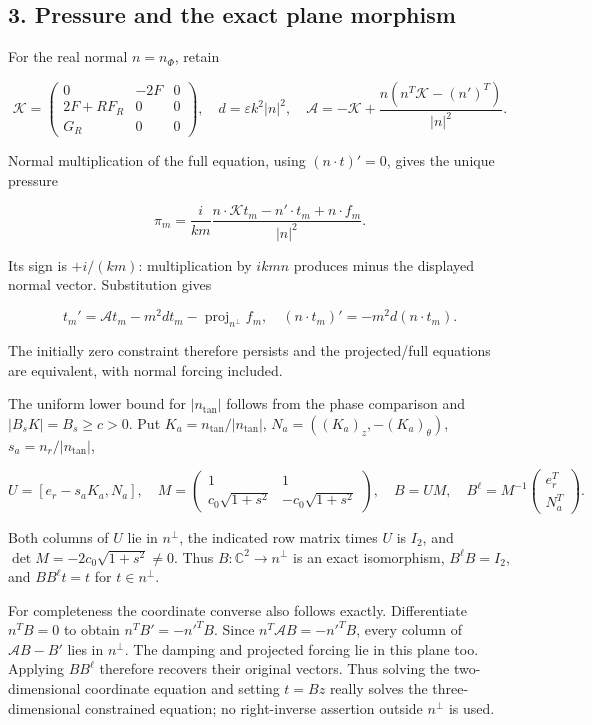 \documentclass[10pt,a4paper]{article}
\newcommand{\N}{\mathcal N_K}
\begin{document}
\subsection{3. Pressure and the exact plane morphism}\label{gclosure:pressure-and-the-exact-plane-morphism}

For the real normal \(n=n_\Phi\), retain

\[
\mathcal K=\begin{pmatrix}0&-2F&0\\2F+RF_R&0&0\\G_R&0&0\end{pmatrix},\quad
d=\varepsilon k^2|n|^2,\quad
\mathcal A=-\mathcal K+\frac{n(n^T\mathcal K-(n')^T)}{|n|^2}.
\]

Normal multiplication of the full equation, using \((n\cdot t)'=0\), gives the unique pressure

\[
\pi_m=\frac{i}{km}\frac{n\cdot\mathcal Kt_m-n'\cdot t_m+n\cdot f_m}{|n|^2}.
\]

Its sign is \(+i/(km)\): multiplication by \(ikm n\) produces minus the displayed normal vector. Substitution gives

\[
t_m'=\mathcal A t_m-m^2dt_m-\operatorname{proj}_{n^\perp}f_m,
\quad
(n\cdot t_m)'=-m^2d(n\cdot t_m).
\]

The initially zero constraint therefore persists and the projected/full equations are equivalent, with normal forcing included.

The uniform lower bound for \(|n_{\tan}|\) follows from the phase comparison and \(|B_sK|=B_s\ge c>0\). Put \(K_a=n_{\tan}/|n_{\tan}|\), \(N_a=((K_a)_z,-(K_a)_\theta)\), \(s_a=n_r/|n_{\tan}|\),

\[
U=[e_r-s_aK_a,N_a],\quad
M=\begin{pmatrix}1&1\\c_0\sqrt{1+s^2}&-c_0\sqrt{1+s^2}\end{pmatrix},\quad
B=UM,\quad B^\ell=M^{-1}\begin{pmatrix}e_r^T\\N_a^T\end{pmatrix}.
\]

Both columns of \(U\) lie in \(n^\perp\), the indicated row matrix times \(U\) is \(I_2\), and \(\det M=-2c_0\sqrt{1+s^2}\ne0\). Thus \(B:\mathbb C^2\to n^\perp\) is an exact isomorphism, \(B^\ell B=I_2\), and \(BB^\ell t=t\) for \(t\in n^\perp\).

For completeness the coordinate converse also follows exactly. Differentiate \(n^TB=0\) to obtain \(n^TB'=-n'^TB\). Since \(n^T\mathcal AB=-n'^TB\), every column of \(\mathcal AB-B'\) lies in \(n^\perp\). The damping and projected forcing lie in this plane too. Applying \(BB^\ell\) therefore recovers their original vectors. Thus solving the two-dimensional coordinate equation and setting \(t=Bz\) really solves the three-dimensional constrained equation; no right-inverse assertion outside \(n^\perp\) is used.
\end{document}
